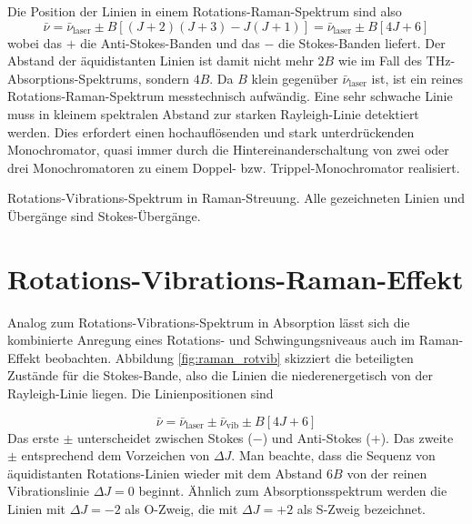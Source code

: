 Die Position der Linien in einem Rotations-Raman-Spektrum sind also
\begin{equation}
 \bar{\nu} =  \bar{\nu}_\text{laser} \pm B \left[ (J+2) (J+3) - J(J+1) \right] = 
 \bar{\nu}_\text{laser} \pm B \left[ 4J + 6 \right]
\end{equation}
wobei das $+$ die Anti-Stokes-Banden und das $-$ die Stokes-Banden liefert. Der Abstand der äquidistanten Linien ist damit nicht mehr $2B$ wie im Fall des THz-Absorptions-Spektrums, sondern $4B$. Da $B$ klein gegenüber $\bar{\nu}_\text{laser} $ ist, ist ein reines Rotations-Raman-Spektrum messtechnisch aufwändig. Eine sehr schwache Linie muss in kleinem spektralen Abstand zur starken Rayleigh-Linie detektiert werden. Dies erfordert einen hochauflösenden und stark unterdrückenden Monochromator, quasi immer durch die Hintereinanderschaltung von zwei oder drei Monochromatoren zu einem Doppel- bzw. Trippel-Monochromator realisiert.




\begin{marginfigure}
\caption{Rotations-Vibrations-Spektrum in Raman-Streuung. Alle gezeichneten Linien und Übergänge sind Stokes-Übergänge.  \label{fig:raman_rotvib}}
\end{marginfigure}

 \section{Rotations-Vibrations-Raman-Effekt}

Analog zum Rotations-Vibrations-Spektrum in Absorption lässt sich die kombinierte Anregung eines Rotations- und Schwingungsniveaus auch im Raman-Effekt beobachten. Abbildung \ref{fig:raman_rotvib} skizziert die beteiligten Zustände für die Stokes-Bande, also die Linien die niederenergetisch von der Rayleigh-Linie liegen. Die Linienpositionen sind 

\begin{equation}
 \bar{\nu} =  \bar{\nu}_\text{laser} \pm \bar{\nu}_\text{vib} \pm B \left[ 4J + 6 \right]
\end{equation}
Das erste $\pm$ unterscheidet zwischen Stokes ($-$) und Anti-Stokes ($+$). Das zweite $\pm$ entsprechend dem Vorzeichen von $\Delta J$. Man beachte, dass die Sequenz von äquidistanten Rotations-Linien wieder mit dem Abstand $6B$ von der reinen Vibrationslinie  $\Delta J = 0$ beginnt. Ähnlich zum Absorptionsspektrum werden die Linien mit $\Delta J =-2$ als O-Zweig, die mit 
$\Delta J =+2$ als S-Zweig bezeichnet.



